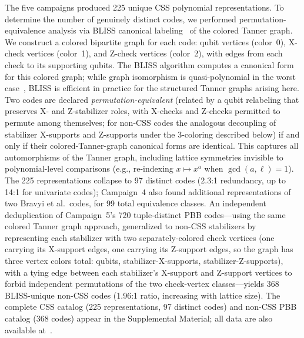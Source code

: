 \documentclass[aps,prxquantum,twocolumn,superscriptaddress,nofootinbib]{revtex4-2}
\begin{document}
The five campaigns produced 225 unique CSS polynomial representations.
To determine the number of genuinely distinct codes, we performed permutation-equivalence analysis via BLISS canonical labeling~\cite{junttila2007engineering} of the colored Tanner graph.
We construct a colored bipartite graph for each code: qubit vertices (color~0), X-check vertices (color~1), and Z-check vertices (color~2), with edges from each check to its supporting qubits.
The BLISS algorithm computes a canonical form for this colored graph; while graph isomorphism is quasi-polynomial in the worst case~\cite{babai2016graph}, BLISS is efficient in practice for the structured Tanner graphs arising here. Two codes are declared \emph{permutation-equivalent} (related by a qubit relabeling that preserves X- and Z-stabilizer roles, with X-checks and Z-checks permitted to permute among themselves; for non-CSS codes the analogous decoupling of stabilizer X-supports and Z-supports under the 3-coloring described below) if and only if their colored-Tanner-graph canonical forms are identical.
This captures all automorphisms of the Tanner graph, including lattice symmetries invisible to polynomial-level comparisons (e.g., re-indexing $x \mapsto x^a$ when $\gcd(a, \ell) = 1$).
The 225 representations collapse to 97 distinct codes (2.3:1 redundancy, up to 14:1 for univariate codes); Campaign~4 also found additional representations of two Bravyi et al.\ codes, for 99 total equivalence classes.
An independent deduplication of Campaign~5's 720 tuple-distinct PBB codes---using the same colored Tanner graph approach, generalized to non-CSS stabilizers by representing each stabilizer with two separately-colored check vertices (one carrying its X-support edges, one carrying its Z-support edges, so the graph has three vertex colors total: qubits, stabilizer-X-supports, stabilizer-Z-supports), with a tying edge between each stabilizer's X-support and Z-support vertices to forbid independent permutations of the two check-vertex classes---yields 368 BLISS-unique non-CSS codes (1.96:1 ratio, increasing with lattice size). The complete CSS catalog (225 representations, 97 distinct codes) and non-CSS PBB catalog (368 codes) appear in the Supplemental Material; all data are also available at~\cite{cruzbenito2026qcode}.
\end{document}
